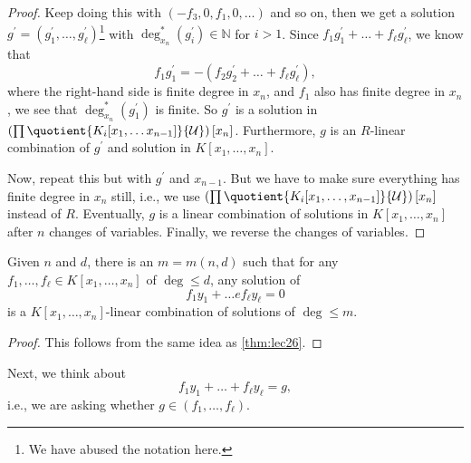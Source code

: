 \begin{proof}
	Keep doing this with \((-f_3, 0, f_1, 0, \dots )\) and so on, then we get a solution \(g^{\prime} = (g_1^{\prime} , \dots , g_{\ell } ^{\prime} )\)\footnote{We have abused the notation here.} with \(\deg^{\ast} _{x_n}(g_i^{\prime} )\in \mathbb{N} \) for \(i > 1\). Since \(f_1 g_1^{\prime} + \dots + f_{\ell } g_{\ell }^{\prime}\), we know that
	\[
		f_1 g_1^{\prime} = -(f_2 g_2^{\prime} + \dots + f_{\ell } g_{\ell } ^{\prime} ),
	\]
	where the right-hand side is finite degree in \(x_n\), and \(f_1\) also has finite degree in \(x_n\), we see that \(\deg^{\ast} _{x_n}(g_1^{\prime} )\) is finite. So \(g^{\prime} \) is a solution in \(\left( \prod \quotient{K_i [x_1, \dots x_{n-1}] }{\mathcal{U} } \right) [x_n]\). Furthermore, \(g\) is an \(R\)-linear combination of \(g^{\prime} \) and solution in \(K[x_1, \dots , x_n]\).

	Now, repeat this but with \(g^{\prime} \) and \(x_{n-1} \). But we have to make sure everything has finite degree in \(x_n\) still, i.e., we use \(\left( \prod \quotient{K_i[x_1, \dots , x_{n-1}]}{\mathcal{U} } \right) [x_n]\) instead of \(R\). Eventually, \(g\) is a linear combination of solutions in \(K[x_1, \dots , x_n]\) after \(n\) changes of variables. Finally, we reverse the changes of variables.
\end{proof}

\begin{theorem}
	Given \(n\) and \(d\), there is an \(m=m(n, d)\) such that for any \(f_1, \dots , f_{\ell }\in K[x_1, \dots , x_n] \) of \(\deg \leq d\), any solution of
	\[
		f_1 y_1 + \dots e f_{\ell } y_{\ell } = 0
	\]
	is a \(K[x_1, \dots , x_n]\)-linear combination of solutions of \(\deg \leq m\).
\end{theorem}
\begin{proof}
	This follows from the same idea as \autoref{thm:lec26}.
\end{proof}

Next, we think about
\[
	f_1 y_1 + \dots + f_{\ell } y_{\ell } = g,
\]
i.e., we are asking whether \(g\in (f_1, \dots , f_{\ell } )\).